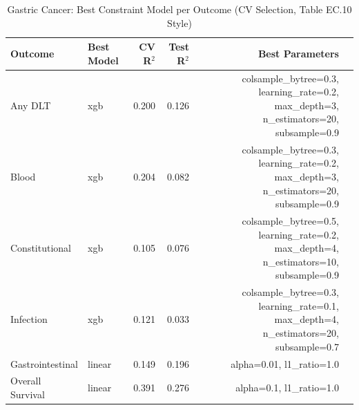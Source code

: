 \begin{table}[ht]
\centering
\caption{Gastric Cancer: Best Constraint Model per Outcome (CV Selection, Table EC.10 Style)}
\begin{tabular}{llrrrl}
\toprule
Outcome & Best Model & CV R$^2$ & Test R$^2$ & Best Parameters \\
\midrule
Any DLT & xgb & 0.200 & 0.126 & colsample_bytree=0.3, learning_rate=0.2, max_depth=3, n_estimators=20, subsample=0.9 \\
Blood & xgb & 0.204 & 0.082 & colsample_bytree=0.3, learning_rate=0.2, max_depth=3, n_estimators=20, subsample=0.9 \\
Constitutional & xgb & 0.105 & 0.076 & colsample_bytree=0.5, learning_rate=0.2, max_depth=4, n_estimators=10, subsample=0.9 \\
Infection & xgb & 0.121 & 0.033 & colsample_bytree=0.3, learning_rate=0.1, max_depth=4, n_estimators=20, subsample=0.7 \\
Gastrointestinal & linear & 0.149 & 0.196 & alpha=0.01, l1_ratio=1.0 \\
Overall Survival & linear & 0.391 & 0.276 & alpha=0.1, l1_ratio=1.0 \\
\bottomrule
\end{tabular}
\end{table}